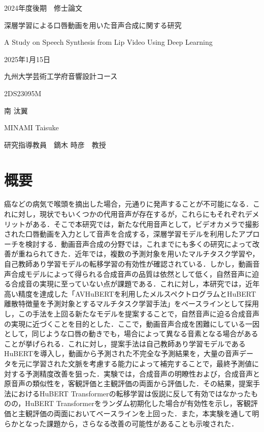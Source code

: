 \documentclass[12pt]{jarticle}
\numberwithin{equation}{section}    %
\numberwithin{figure}{section}      %
\numberwithin{table}{section}      %
\begin{document}
\begin{titlepage}
    \begin{center}
        {\Large 2024年度後期　修士論文}
        \vspace{120truept}

        {\huge 深層学習による口唇動画を用いた音声合成に関する研究}
        \vspace{30truept}

        {\huge A Study on Speech Synthesis from Lip Video Using Deep Learning}
        \vspace{120truept}

        {\Large 2025年1月15日}
        \vspace{10truept}

        {\Large 九州大学芸術工学府音響設計コース}
        \vspace{70truept}

        {\Large 2DS23095M}
        \vspace{10truept}

        {\Large 南 汰翼}
        \vspace{10truept}

        {\Large MINAMI Taisuke}
        \vspace{30truept}

        {\Large 研究指導教員　鏑木 時彦　教授}
    \end{center}
\end{titlepage}

\section*{概要}
\thispagestyle{empty}
癌などの病気で喉頭を摘出した場合，元通りに発声することが不可能になる．これに対し，現状でもいくつかの代用音声が存在するが，これらにもそれぞれデメリットがある．そこで本研究では，新たな代用音声として，ビデオカメラで撮影された口唇動画を入力として音声を合成する，深層学習モデルを利用したアプローチを検討する．動画音声合成の分野では，これまでにも多くの研究によって改善が重ねられてきた．近年では，複数の予測対象を用いたマルチタスク学習や，自己教師あり学習モデルの転移学習の有効性が確認されている．しかし，動画音声合成モデルによって得られる合成音声の品質は依然として低く，自然音声に迫る合成音の実現に至っていない点が課題である．これに対し，本研究では，近年高い精度を達成した「AVHuBERTを利用したメルスペクトログラムとHuBERT離散特徴量を予測対象とするマルチタスク学習手法」をベースラインとして採用し，この手法を上回る新たなモデルを提案することで，自然音声に迫る合成音声の実現に近づくことを目的とした．ここで，動画音声合成を困難にしている一因として，同じような口唇の動きでも，場合によって異なる音素となる場合があることが挙げられる．これに対し，提案手法は自己教師あり学習モデルであるHuBERTを導入し，動画から予測された不完全な予測結果を，大量の音声データを元に学習された文脈を考慮する能力によって補完することで，最終予測値に対する予測精度改善を狙った．実験では，合成音声の明瞭性および，合成音声と原音声の類似性を，客観評価と主観評価の両面から評価した．その結果，提案手法におけるHuBERT Transformerの転移学習は仮説に反して有効ではなかったものの，HuBERT Transformerをランダム初期化した場合が有効性を示し，客観評価と主観評価の両面においてベースラインを上回った．また，本実験を通して明らかとなった課題から，さらなる改善の可能性があることも示唆された．
\end{document}

